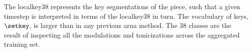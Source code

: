 
The \gls{localkey38} represents the key segmentations of the
piece, such that a given timestep is interpreted in terms of
the \gls{localkey38} in turn. 
The vocabulary of keys, $\setkey$, is larger than in any
previous \gls{arna} method. The 38 classes are the result of
inspecting all the modulations and tonicizations across the
aggregated training set.
